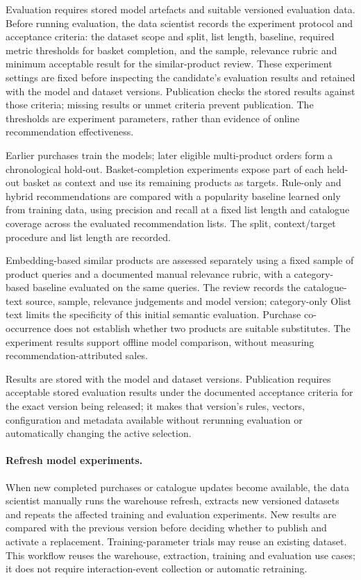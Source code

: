 \documentclass[a4paper,12pt]{article}
\begin{document}
Evaluation requires stored model artefacts and suitable versioned evaluation data. Before running
evaluation, the data scientist records the experiment protocol and acceptance criteria: the dataset
scope and split, list length, baseline, required metric thresholds for basket completion, and the
sample, relevance rubric and minimum acceptable result for the similar-product review. These
experiment settings are fixed before inspecting the candidate's evaluation results and retained
with the model and dataset versions. Publication checks the stored results against those criteria;
missing results or unmet criteria prevent publication. The thresholds are experiment parameters,
rather than evidence of online recommendation effectiveness.

Earlier purchases
train the models; later eligible multi-product orders form a chronological hold-out. Basket-completion
experiments expose part of each held-out basket as context and use its remaining products as targets.
Rule-only and hybrid recommendations are compared with a popularity baseline learned only from
training data, using precision and recall at a fixed list length and catalogue coverage across the
evaluated recommendation lists. The split, context/target procedure and list length are recorded.

Embedding-based similar products are assessed separately using a fixed sample of product queries
and a documented manual relevance rubric, with a category-based baseline evaluated on the same
queries. The review records the catalogue-text source, sample, relevance judgements and model version;
category-only Olist text limits the specificity of this initial semantic evaluation. Purchase
co-occurrence does not establish whether two products are suitable substitutes. The experiment
results support offline model comparison, without measuring recommendation-attributed sales.

Results are stored with the model and dataset versions. Publication requires acceptable stored
evaluation results under the documented acceptance criteria for the exact version being released;
it makes that version's rules, vectors, configuration and metadata available without rerunning
evaluation or automatically changing the active selection.

\paragraph{Refresh model experiments.}
When new completed purchases or catalogue updates become available, the data scientist manually runs
the warehouse refresh, extracts new versioned datasets and repeats the affected training and
evaluation experiments. New results are compared with the previous version before deciding whether
to publish and activate a replacement. Training-parameter trials may reuse an existing dataset.
This workflow reuses the warehouse, extraction, training and evaluation use cases; it does not
require interaction-event collection or automatic retraining.
\end{document}
